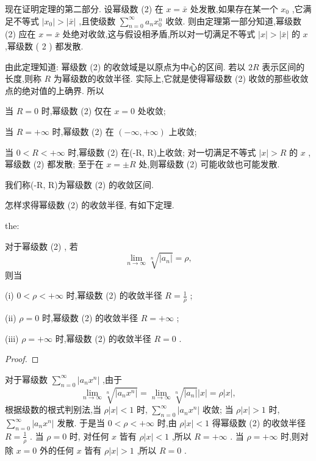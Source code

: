 现在证明定理的第二部分. 设幂级数 (2) 在 \(x = \bar{x}\) 处发散,如果存在某一个 \({x}_{0}\) ,它满足不等式 \(\left| {x}_{0}\right|  > \left| \bar{x}\right|\) ,且使级数 \(\mathop{\sum }\limits_{{n = 0}}^{\infty }{a}_{n}{x}_{0}^{n}\) 收敛. 则由定理第一部分知道,幂级数 (2) 应在 \(x = \bar{x}\) 处绝对收敛,这与假设相矛盾,所以对一切满足不等式 \(\left| x\right|  > \left| \bar{x}\right|\) 的 \(x\) ,幂级数 ( 2 ) 都发散.

由此定理知道: 幂级数 (2) 的收敛域是以原点为中心的区间. 若以 \({2R}\) 表示区间的长度,则称 \(R\) 为幂级数的收敛半径. 实际上,它就是使得幂级数 (2) 收敛的那些收敛点的绝对值的上确界. 所以

当 \(R = 0\) 时,幂级数 (2) 仅在 \(x = 0\) 处收敛;

当 \(R =  + \infty\) 时,幂级数 (2) 在 \(\left( {-\infty , + \infty }\right)\) 上收敛;

当 \(0 < R <  + \infty\) 时,幂级数 (2) 在(-R, R)上收敛; 对一切满足不等式 \(\left| x\right|  > R\) 的 \(x\) ,幂级数 (2) 都发散; 至于在 \(x =  \pm  R\) 处,则幂级数 (2) 可能收敛也可能发散.

我们称(-R, R)为幂级数 (2) 的收敛区间.

怎样求得幂级数 (2) 的收敛半径, 有如下定理.

\begin{theorem}{}{the:}

\end{theorem}
 对于幂级数 (2) , 若
\[
\mathop{\lim }\limits_{{n \rightarrow  \infty }}\sqrt[n]{\left| {a}_{n}\right| } = \rho , \tag{3}
\]
则当

(i) \(0 < \rho  <  + \infty\) 时,幂级数 (2) 的收敛半径 \(R = \frac{1}{\rho }\) ;

(ii) \(\rho  = 0\) 时,幂级数 (2) 的收敛半径 \(R =  + \infty\) ;

(iii) \(\rho  =  + \infty\) 时,幂级数 (2) 的收敛半径 \(R = 0\) .

\begin{proof}

\end{proof}
对于幂级数 \(\mathop{\sum }\limits_{{n = 0}}^{\infty }\left| {{a}_{n}{x}^{n}}\right|\) ,由于
\[
\mathop{\lim }\limits_{{n \rightarrow  \infty }}\sqrt[n]{\left| {a}_{n}{x}^{n}\right| } = \mathop{\lim }\limits_{{n \rightarrow  \infty }}\sqrt[n]{\left| {a}_{n}\right| }\left| x\right|  = \rho \left| x\right| ,
\]
根据级数的根式判别法,当 \(\rho \left| x\right|  < 1\) 时, \(\mathop{\sum }\limits_{{n = 0}}^{\infty }\left| {{a}_{n}{x}^{n}}\right|\) 收敛; 当 \(\rho \left| x\right|  > 1\) 时, \(\mathop{\sum }\limits_{{n = 0}}^{\infty }\left| {{a}_{n}{x}^{n}}\right|\) 发散. 于是当 \(0 < \rho  <  + \infty\) 时,由 \(\rho \left| x\right|  < 1\) 得幂级数 (2) 的收敛半径 \(R = \frac{1}{\rho }\) . 当 \(\rho  = 0\) 时, 对任何 \(x\) 皆有 \(\rho \left| x\right|  < 1\) ,所以 \(R =  + \infty\) . 当 \(\rho  =  + \infty\) 时,则对除 \(x = 0\) 外的任何 \(x\) 皆有 \(\rho \left| x\right|  > 1\) ,所以 \(R = 0\) .

